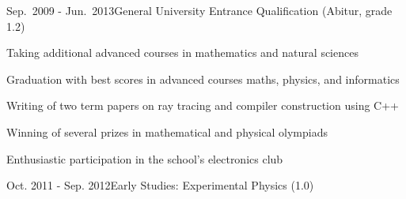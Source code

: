\documentclass[a4paper,10pt]{cv}
\begin{document}
  \cvHead
      \begin{cvTimeItem}{Sep.~2009 - Jun.~2013}{General University Entrance Qualification (Abitur, grade 1.2)}
        \begin{cvItemize}
          \item Taking additional advanced courses in mathematics and natural sciences
          \item Graduation with best scores in advanced courses maths, physics, and informatics
          \item Writing of two term papers on ray tracing and compiler construction using C++
          \item Winning of several prizes in mathematical and physical olympiads
          \item Enthusiastic participation in the school's electronics club
        \end{cvItemize}
      \end{cvTimeItem}

      \begin{cvTimeItem}{Oct. 2011 - Sep. 2012}{Early Studies: Experimental Physics (1.0)}
      \end{cvTimeItem}
\end{document}
